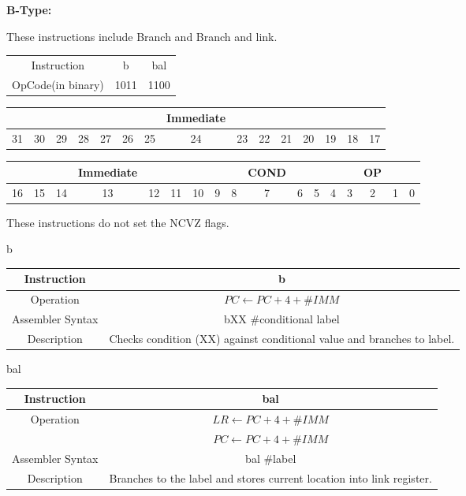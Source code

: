 \documentclass[]{article}
\begin{document}
\pagebreak

{\Large
	\textbf{
		B-Type:
	}
}

\noindent These instructions include Branch and Branch and link.

\begin{center}
	\begin{tabular}{|c|c|c|}\cline{1-3}
	Instruction & b & bal \\\cline{1-3}\hfill
	OpCode(in binary) & 1011 & 1100 \\\cline{1-3}
	\end{tabular}\vspace{1.5cm}
\end{center}

\begin{tabular}{|ccccccccccccccc|}\hline
  &  &  &  &  &  &  & Immediate & &  &  &  & &  &\\\hline
31&30&29&28&27&26&25&24&23&22&21&20&19&18&17\\\hline
\end{tabular}

\begin{tabular}{|cccccccc|cccc|ccccc|}\hline
	&  & & Immediate & &  & & & & COND & & & & & OP & & \\\hline
16&15&14&13&12&11&10&9&8&7&6&5&4&3&2&1&0\\\hline
\end{tabular}
\vspace{5mm}

\noindent These instructions do not set the NCVZ flags.

b\\
\begin{tabularx}{\textwidth}{c|c}\hline
	Instruction & b\\\hline
	Operation & $PC \leftarrow PC + 4 + \#IMM$\\\hline
	Assembler Syntax & bXX \#conditional label\\\hline
	Description & Checks condition (XX) against conditional value and branches to label.\\\hline
\end{tabularx}\vspace{1.5cm}

bal\\
\begin{tabularx}{\textwidth}{c|c}\hline
	Instruction & bal\\\hline
	Operation & $LR \leftarrow PC + 4 + \#IMM$\\&$PC \leftarrow PC + 4 + \#IMM$\\\hline
	Assembler Syntax & bal \#label\\\hline
	Description & Branches to the label and stores current location into link register.\\\hline
\end{tabularx}\vspace{1.5cm}
\end{document}
